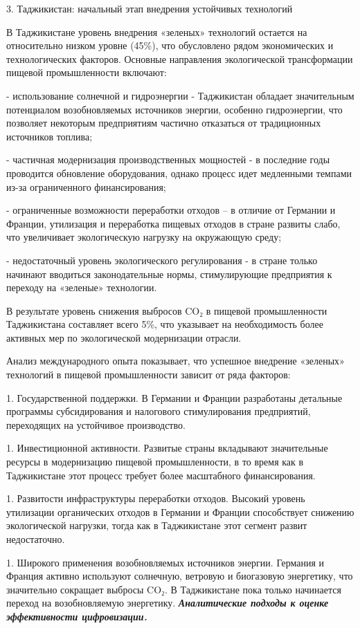 3. Таджикистан: начальный этап внедрения устойчивых технологий

В Таджикистане уровень внедрения «зеленых» технологий остается на
относительно низком уровне (45\%), что обусловлено рядом экономических и
технологических факторов. Основные направления экологической
трансформации пищевой промышленности включают:

- использование солнечной и гидроэнергии - Таджикистан обладает
значительным потенциалом возобновляемых источников энергии, особенно
гидроэнергии, что позволяет некоторым предприятиям частично отказаться
от традиционных источников топлива;

- частичная модернизация производственных мощностей - в последние годы
проводится обновление оборудования, однако процесс идет медленными
темпами из-за ограниченного финансирования;

- ограниченные возможности переработки отходов -- в отличие от Германии
и Франции, утилизация и переработка пищевых отходов в стране развиты
слабо, что увеличивает экологическую нагрузку на окружающую среду;

- недостаточный уровень экологического регулирования - в стране только
начинают вводиться законодательные нормы, стимулирующие предприятия к
переходу на «зеленые» технологии.

В результате уровень снижения выбросов CO₂ в пищевой промышленности
Таджикистана составляет всего 5\%, что указывает на необходимость более
активных мер по экологической модернизации отрасли.

Анализ международного опыта показывает, что успешное внедрение «зеленых»
технологий в пищевой промышленности зависит от ряда факторов:


1. Государственной поддержки. В Германии и Франции разработаны детальные
программы субсидирования и налогового стимулирования предприятий,
переходящих на устойчивое производство.

1. Инвестиционной активности. Развитые страны вкладывают значительные
ресурсы в модернизацию пищевой промышленности, в то время как в
Таджикистане этот процесс требует более масштабного финансирования.

1. Развитости инфраструктуры переработки отходов. Высокий уровень
утилизации органических отходов в Германии и Франции способствует
снижению экологической нагрузки, тогда как в Таджикистане этот сегмент
развит недостаточно.

1. Широкого применения возобновляемых источников энергии. Германия и
Франция активно используют солнечную, ветровую и биогазовую
энергетику, что значительно сокращает выбросы CO₂. В Таджикистане пока
только начинается переход на возобновляемую энергетику.
\emph{{\bfseries Аналитические подходы к оценке эффективности
цифровизации.}}

